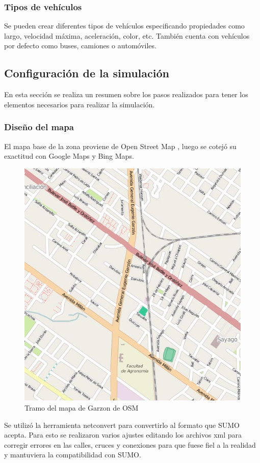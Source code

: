 \subsubsection{Tipos de vehículos}
Se pueden crear diferentes tipos de vehículos especificando propiedades como largo, velocidad máxima,  aceleración, color, etc. También cuenta con vehículos por defecto como buses, camiones o automóviles.

\subsection{Configuración de la simulación}

En esta sección se realiza un resumen sobre los pasos realizados para tener los elementos necesarios para realizar la simulación.

\subsubsection{Diseño del mapa}


El mapa base de la zona proviene de Open Street Map \citep{OSM}, luego se cotejó su exactitud con Google Maps y Bing Maps.

\begin{figure}[H]
	\centering
	\includegraphics[width=0.7\linewidth]{Figures/osm_garzon}
	\caption{Tramo del mapa de Garzon de OSM}
	\label{fig:osm_garzon}
\end{figure}


Se utilizó la herramienta netconvert para convertirlo al formato que SUMO acepta. 
Para esto se realizaron varios ajustes editando los archivos xml para corregir errores en las calles, cruces y conexiones para que fuese fiel a la realidad y mantuviera la compatibilidad con SUMO.


